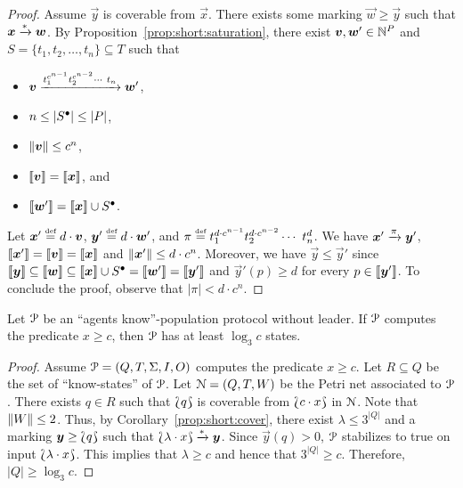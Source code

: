 \begin{proof}
  Assume $\vec{y}$ is coverable from $\vec{x}$. There exists some
  marking $\vec{w} \geq \vec{y}$ such that $\bm{x} \xrightarrow{*}
  \bm{w}$. By Proposition~\ref{prop:short:saturation}, there exist
  $\bm{v}, \bm{w}' \in \mathbb{N}^P$ and $S = \{t_1, t_2, \ldots, t_n\}
  \subseteq T$ such that
  \begin{itemize}
  \item $\bm{v} \xrightarrow{t_1^{c^{n-1}} t_2^{c^{n-2}} \cdots\ t_n}
    \bm{w}'$,

  \item $n \leq |{S^\bullet}| \leq |P|$,

  \item $\lVert\bm{v}\rVert \leq c^n$,

  \item $\llbracket\bm{v}\rrbracket = \llbracket\bm{x}\rrbracket$, and 

  \item $\llbracket\bm{w}'\rrbracket = \llbracket\bm{x}\rrbracket \cup {S^\bullet}$.
  \end{itemize}

  Let $\bm{x}' \stackrel{\scriptscriptstyle\text{def}}{=} d \cdot \bm{v}$, $\bm{y}' \stackrel{\scriptscriptstyle\text{def}}{=} d \cdot
  \bm{w}'$, and $\pi \stackrel{\scriptscriptstyle\text{def}}{=} t_1^{d \cdot c^{n-1}} t_2^{d \cdot
    c^{n-2}} \cdots\ t_n^{d}$. We have $\bm{x}' \xrightarrow{\pi}
  \bm{y}'$, $\llbracket\bm{x}'\rrbracket = \llbracket\bm{v}\rrbracket = \llbracket\bm{x}\rrbracket$ and
  $\lVert\bm{x}'\rVert \leq d \cdot c^n$. Moreover, we have $\vec{y} \leq
  \vec{y}'$ since $\llbracket\bm{y}\rrbracket \subseteq \llbracket\bm{w}\rrbracket \subseteq
  \llbracket\bm{x}\rrbracket \cup {S^\bullet} = \llbracket\bm{w}'\rrbracket = \llbracket\bm{y}'\rrbracket$
  and $\vec{y}'(p) \geq d$ for every $p \in \llbracket\bm{y}'\rrbracket$. To
  conclude the proof, observe that $|\pi| < d \cdot c^n$.
\end{proof}

\begin{theorem}
  Let $\mathcal{P}$ be an ``agents know''-population protocol without
  leader. If $\mathcal{P}$ computes the predicate $x \geq c$, then $\mathcal{P}$ has
  at least $\log_3 c$ states.
\end{theorem}

\begin{proof}
  Assume $\mathcal{P} = (Q, T, \Sigma, I, O)$ computes the predicate $x \geq
  c$. Let $R \subseteq Q$ be the set of ``know-states'' of $\mathcal{P}$. Let
  $\mathcal{N} = (Q, T, W)$ be the Petri net associated to $\mathcal{P}$. There exists
  $q \in R$ such that $\Lbag q\Rbag$ is coverable from $\Lbag c
    \cdot x\Rbag$ in $\mathcal{N}$. Note that $\lVert W\rVert \leq 2$. Thus, by
  Corollary~\ref{prop:short:cover}, there exist $\lambda \leq 3^{|Q|}$
  and a marking $\bm{y} \geq \Lbag q\Rbag$ such that
  $\Lbag\lambda \cdot x\Rbag \xrightarrow{*} \bm{y}$. Since $\vec{y}(q) >
  0$, $\mathcal{P}$ stabilizes to true on input $\Lbag\lambda \cdot
    x\Rbag$. This implies that $\lambda \geq c$ and hence that $3^{|Q|}
  \geq c$. Therefore, $|Q| \geq \log_3 c$.
\end{proof}

